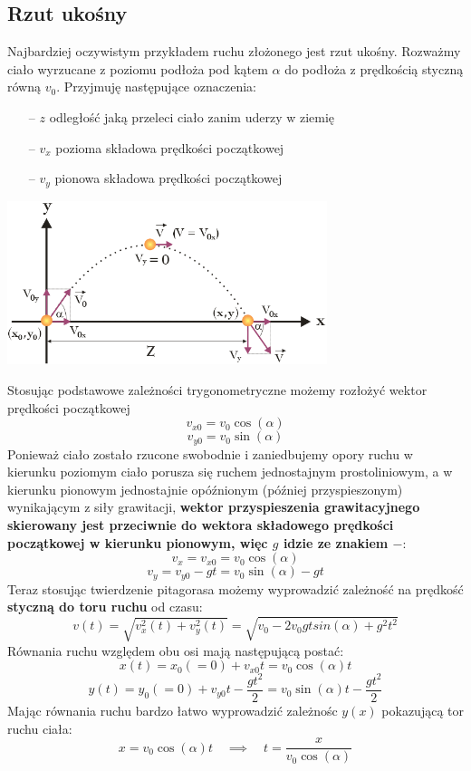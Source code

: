 \documentclass[a4paper]{article}
\begin{document}
    \subsection*{\Large Rzut ukośny}
    Najbardziej oczywistym przykładem ruchu złożonego jest rzut ukośny. 
    Rozważmy ciało wyrzucane z poziomu podłoża pod kątem $\alpha$ do podłoża z prędkością styczną 
    równą $v_0$. Przyjmuję następujące oznaczenia:
    \begin{itemize}
        \item[--] $z$ odległość jaką przeleci ciało zanim uderzy w ziemię
        \item[--] $v_x$ pozioma składowa prędkości początkowej
        \item[--] $v_y$ pionowa składowa prędkości początkowej
    \end{itemize}
    \begin{center}
        \includegraphics[width=0.7\textwidth]{rzut_ukosny.png}
    \end{center}
    Stosując podstawowe zależności trygonometryczne możemy rozłożyć wektor prędkości początkowej
    \[v_{x0} = v_0\cos(\alpha)\]
    \[v_{y0} = v_0\sin(\alpha)\]
    Ponieważ ciało zostało rzucone swobodnie i zaniedbujemy opory ruchu w kierunku poziomym ciało 
    porusza się ruchem jednostajnym prostoliniowym, a w kierunku pionowym jednostajnie opóźnionym 
    (później przyspieszonym) wynikającym z siły grawitacji, \textbf{wektor przyspieszenia grawitacyjnego 
    skierowany jest przeciwnie do wektora składowego prędkości początkowej w kierunku pionowym, więc 
    $g$ idzie ze znakiem $-$}:
    \[v_x = v_{x0} = v_0\cos(\alpha)\]
    \[v_y = v_{y0} - gt = v_0\sin(\alpha) - gt\]
    Teraz stosując twierdzenie pitagorasa możemy wyprowadzić zależność na prędkość \textbf{styczną do toru ruchu} od czasu:
    \[v(t) = \sqrt{v_x^2(t) + v_y^2(t)} = \sqrt{v_0 - 2v_0gtsin(\alpha) + g^2t^2}\]
    Równania ruchu względem obu osi mają następującą postać:
    \[x(t) = x_0(=0) + v_{x0}t = v_0\cos(\alpha)t\]
    \[y(t) = y_0(=0) + v_{y0}t - \frac{gt^2}{2} = v_0\sin(\alpha)t - \frac{gt^2}{2}\]
    Mając równania ruchu bardzo łatwo wyprowadzić zależnośc $y(x)$ pokazującą tor ruchu ciała:
    \[x = v_0\cos(\alpha)t \quad\implies\quad t = \frac{x}{v_0\cos(\alpha)}\]
    
\end{document}
